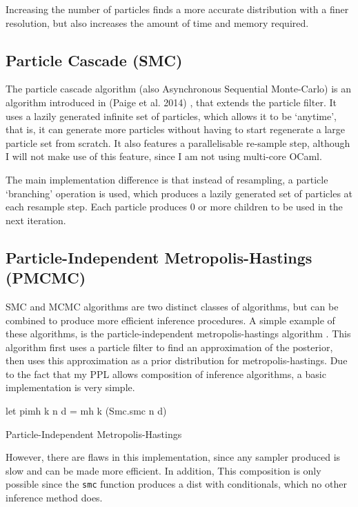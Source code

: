 Increasing the number of particles finds a more accurate distribution with a finer resolution, but also increases the amount of time and memory required.
	
\subsection{Particle Cascade (SMC)} \label{sec:pc}
The particle cascade algorithm (also Asynchronous Sequential Monte-Carlo) is an algorithm introduced in (Paige et al. 2014) \cite{paige2014asynchronous}, that extends the particle filter. It uses a lazily generated infinite set of particles, which allows it to be `anytime', that is, it can generate more particles without having to start regenerate a large particle set from scratch. It also features a parallelisable re-sample step, although I will not make use of this feature, since I am not using multi-core OCaml.

The main implementation difference is that instead of resampling, a particle `branching' operation is used, which produces a lazily generated set of particles at each resample step. Each particle produces 0 or more children to be used in the next iteration.

\subsection{Particle-Independent Metropolis-Hastings (PMCMC)} \label{sec:pimh}

SMC and MCMC algorithms are two distinct classes of algorithms, but can be combined to produce more efficient inference procedures. A simple example of these algorithms, is the particle-independent metropolis-hastings algorithm \cite{pmcmc}. This algorithm first uses a particle filter to find an approximation of the posterior, then uses this approximation as a prior distribution for metropolis-hastings.
Due to the fact that my PPL allows composition of inference algorithms, a basic implementation is very simple.
	
\begin{listing}
\begin{ocamlcode-in}
let pimh k n d = mh k (Smc.smc n d)
\end{ocamlcode-in}
\caption{Particle-Independent Metropolis-Hastings}
\end{listing}
However, there are flaws in this implementation, since any sampler produced is slow and can be made more efficient. In addition, This composition is only possible since the \texttt{smc} function produces a dist with conditionals, which no other inference method does.

